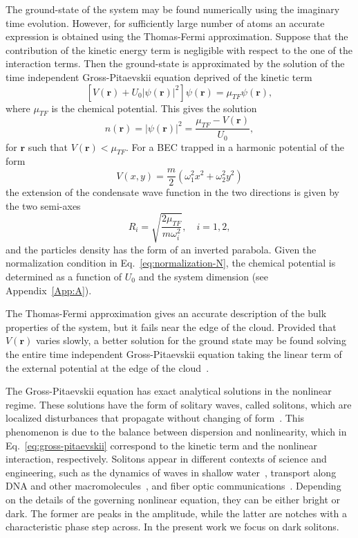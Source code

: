 The ground-state of the system may be found numerically using the imaginary time evolution. However, for sufficiently large number of atoms an accurate expression is obtained using the Thomas-Fermi approximation. Suppose that the contribution of the kinetic energy term is negligible with respect to the one of the interaction terms. Then the ground-state is approximated by the solution of the time independent Gross-Pitaevskii equation deprived of the kinetic term
\begin{equation}
\left[ V(\textbf{r}) + U_0 |\psi(\textbf{r})|^2 \right] \psi(\textbf{r}) = \mu_{TF} \psi(\textbf{r}),
\end{equation}
where $\mu_{TF}$ is the chemical potential. This gives the solution
\begin{equation}
n(\textbf{r}) = |\psi(\textbf{r})|^2 = \frac{\mu_{TF} - V(\textbf{r})}{U_0},
\end{equation}
for $\textbf{r}$ such that $V(\textbf{r}) < \mu_{TF}$. 
For a BEC trapped in a harmonic potential of the form
\begin{equation}
V(x,y) = \frac{m}{2} (\omega_1^2 x^2 + \omega_2^2 y^2)
\end{equation}
the extension of the condensate wave function in the two directions is given by the two semi-axes
\begin{equation} \label{eq:TF-radius}
R_i = \sqrt{\frac{2\mu_{TF}}{m\omega_i^2}}, \quad i = 1,2 ,
\end{equation}
and the particles density has the form of an inverted parabola. Given the normalization condition in Eq.~\eqref{eq:normalization-N}, the chemical potential is determined as a function of $U_0$ and the system dimension (see Appendix~\ref{App:A}).

The Thomas-Fermi approximation gives an accurate description of the bulk properties of the system, but it fails near the edge of the cloud. Provided that $V(\textbf{r})$ varies slowly, a better solution for the ground state may be found solving the entire time independent Gross-Pitaevskii equation taking the linear term of the external potential at the edge of the cloud~\citep{pethick2002bose}.

The Gross-Pitaevskii equation has exact analytical solutions in the nonlinear regime. These solutions have the form of solitary waves, called solitons, which are localized disturbances that propagate without changing of form~\citep{RC97,JKP98,DCLZ98,ZPMW99}. This phenomenon is due to the balance between dispersion and nonlinearity, which in Eq.~\eqref{eq:gross-pitaevskii} correspond to the kinetic term and the nonlinear interaction, respectively. Solitons appear in different contexts of science and engineering, such as the dynamics of waves in shallow water~\citep{B88}, transport along DNA and other macromolecules~\citep{P95}, and fiber optic communications~\citep{H90}.
Depending on the details of the governing nonlinear equation, they can be either bright or dark. The former are peaks in the amplitude, while the latter are notches with a characteristic phase step across. In the present work we focus on dark solitons. 

